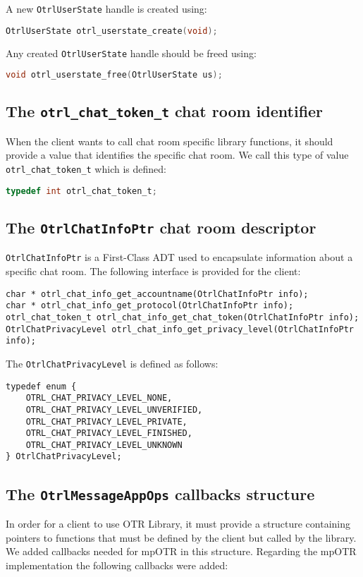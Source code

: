 A new \texttt{OtrlUserState} handle is created using:
\begin{lstlisting}[language=C]
OtrlUserState otrl_userstate_create(void);
\end{lstlisting}  
    
Any created \texttt{OtrlUserState} handle should be freed using:
\begin{lstlisting}[language=C]
void otrl_userstate_free(OtrlUserState us);
\end{lstlisting}

\subsection{The \texttt{otrl\_chat\_token\_t} chat room identifier}
When the client wants to call chat room specific library functions, it should provide a value that identifies the specific chat room. We call this type of value \texttt{otrl\_chat\_token\_t} which is defined:
\begin{lstlisting}[language=C]
typedef int otrl_chat_token_t;
\end{lstlisting}

\subsection{The \texttt{OtrlChatInfoPtr} chat room descriptor}
\texttt{OtrlChatInfoPtr} is a First-Class ADT used to encapsulate information about a specific chat room. The following interface is provided for the client:
\begin{lstlisting}
char * otrl_chat_info_get_accountname(OtrlChatInfoPtr info);
char * otrl_chat_info_get_protocol(OtrlChatInfoPtr info);
otrl_chat_token_t otrl_chat_info_get_chat_token(OtrlChatInfoPtr info);
OtrlChatPrivacyLevel otrl_chat_info_get_privacy_level(OtrlChatInfoPtr info);
\end{lstlisting}

The \texttt{OtrlChatPrivacyLevel} is defined as follows:
\begin{lstlisting}
typedef enum {
	OTRL_CHAT_PRIVACY_LEVEL_NONE,
	OTRL_CHAT_PRIVACY_LEVEL_UNVERIFIED,
	OTRL_CHAT_PRIVACY_LEVEL_PRIVATE,
	OTRL_CHAT_PRIVACY_LEVEL_FINISHED,
	OTRL_CHAT_PRIVACY_LEVEL_UNKNOWN
} OtrlChatPrivacyLevel;
\end{lstlisting}

\subsection{The \texttt{OtrlMessageAppOps} callbacks structure}
\label{section:callbacks_structure}
In order for a client to use OTR Library, it must provide a structure containing pointers to functions that must be defined by the client but called by the library. We added callbacks needed for mpOTR in this structure. Regarding the mpOTR implementation the following callbacks were added:

